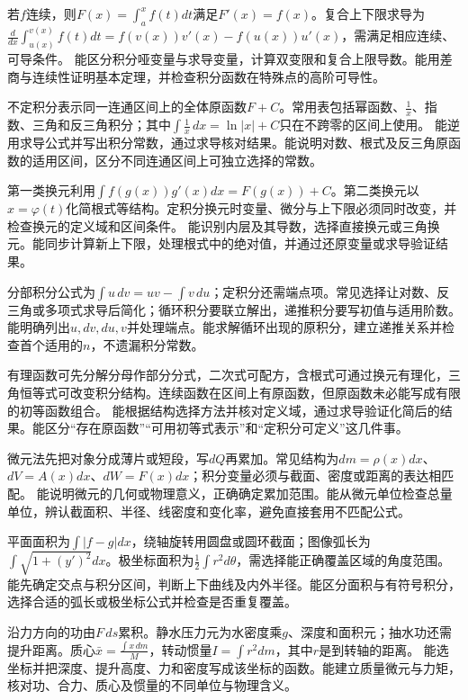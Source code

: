 {若$f$连续，则$F(x)=\int_a^xf(t)dt$满足$F'(x)=f(x)$。复合上下限求导为$\frac d{dx}\int_{u(x)}^{v(x)}f(t)dt=f(v(x))v'(x)-f(u(x))u'(x)$，需满足相应连续、可导条件。}
{能区分积分哑变量与求导变量，计算双变限和复合上限导数。能用差商与连续性证明基本定理，并检查积分函数在特殊点的高阶可导性。}

{不定积分表示同一连通区间上的全体原函数$F+C$。常用表包括幂函数、$\frac1x$、指数、三角和反三角积分；其中$\int\frac1x\,dx=\ln|x|+C$只在不跨零的区间上使用。}
{能逆用求导公式并写出积分常数，通过求导核对结果。能说明对数、根式及反三角原函数的适用区间，区分不同连通区间上可独立选择的常数。}

{第一类换元利用$\int f(g(x))g'(x)dx=F(g(x))+C$。第二类换元以$x=\varphi(t)$化简根式等结构。定积分换元时变量、微分与上下限必须同时改变，并检查换元的定义域和区间条件。}
{能识别内层及其导数，选择直接换元或三角换元。能同步计算新上下限，处理根式中的绝对值，并通过还原变量或求导验证结果。}

{分部积分公式为$\int u\,dv=uv-\int v\,du$；定积分还需端点项。常见选择让对数、反三角或多项式求导后简化；循环积分要联立解出，递推积分要写初值与适用阶数。}
{能明确列出$u,dv,du,v$并处理端点。能求解循环出现的原积分，建立递推关系并检查首个适用的$n$，不遗漏积分常数。}

{有理函数可先分解分母作部分分式，二次式可配方，含根式可通过换元有理化，三角恒等式可改变积分结构。连续函数在区间上有原函数，但原函数未必能写成有限的初等函数组合。}
{能根据结构选择方法并核对定义域，通过求导验证化简后的结果。能区分“存在原函数”“可用初等式表示”和“定积分可定义”这几件事。}

{微元法先把对象分成薄片或短段，写$dQ$再累加。常见结构为$dm=\rho(x)dx$、$dV=A(x)dx$、$dW=F(x)dx$；积分变量必须与截面、密度或距离的表达相匹配。}
{能说明微元的几何或物理意义，正确确定累加范围。能从微元单位检查总量单位，辨认截面积、半径、线密度和变化率，避免直接套用不匹配公式。}

{平面面积为$\int|f-g|dx$，绕轴旋转用圆盘或圆环截面；图像弧长为$\int\sqrt{1+(y')^2}dx$。极坐标面积为$\frac12\int r^2d\theta$，需选择能正确覆盖区域的角度范围。}
{能先确定交点与积分区间，判断上下曲线及内外半径。能区分面积与有符号积分，选择合适的弧长或极坐标公式并检查是否重复覆盖。}

{沿力方向的功由$F\,ds$累积。静水压力元为水密度乘$g$、深度和面积元；抽水功还需提升距离。质心$\bar x=\frac{\int x\,dm}{M}$，转动惯量$I=\int r^2dm$，其中$r$是到转轴的距离。}
{能选坐标并把深度、提升高度、力和密度写成该坐标的函数。能建立质量微元与力矩，核对功、合力、质心及惯量的不同单位与物理含义。}

